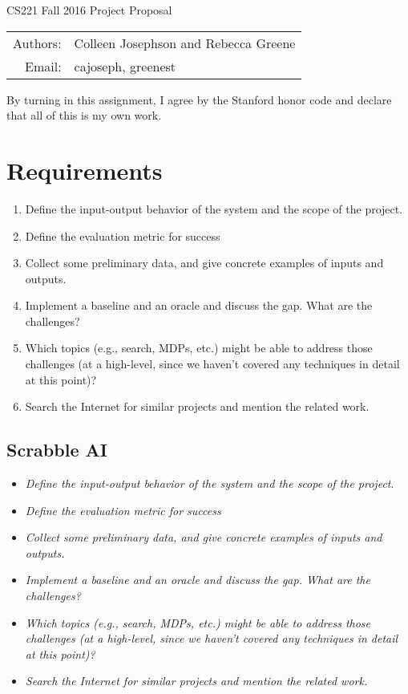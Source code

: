 \documentclass[12pt]{article}
\begin{document}
\begin{center}
{\Large CS221 Fall 2016 Project Proposal}

\begin{tabular}{rl}
  Authors: & Colleen Josephson and Rebecca Greene\\
  Email: & cajoseph, greenest
\end{tabular}
\end{center}

By turning in this assignment, I agree by the Stanford honor code and
declare that all of this is my own work.

\section*{Requirements}
\begin{enumerate}[label=(\roman*)]
  \item  Define the input-output behavior of the system and the scope of the project.
  \item  Define the evaluation metric for success
  \item  Collect some preliminary data, and give concrete examples of inputs and outputs.
  \item  Implement a baseline and an oracle and discuss the gap. What are the challenges?
  \item Which topics (e.g., search, MDPs, etc.) might be able to address those challenges (at a high-level, since we haven't covered any techniques in detail at this point)?
  \item  Search the Internet for similar projects and mention the related work.
\end{enumerate}

\subsection{Scrabble AI}
\begin{itemize}
  \item  \emph{Define the input-output behavior of the system and the scope of the project}.
  \item  \emph{Define the evaluation metric for success}
  \item  \emph{Collect some preliminary data, and give concrete examples of inputs and outputs.}
  \item  \emph{Implement a baseline and an oracle and discuss the gap. What are the challenges?}
  \item \emph{Which topics (e.g., search, MDPs, etc.) might be able to address those challenges (at a high-level, since we haven't covered any techniques in detail at this point)?}
  \item  \emph{Search the Internet for similar projects and mention the related work.}
\end{itemize}
\end{document}
